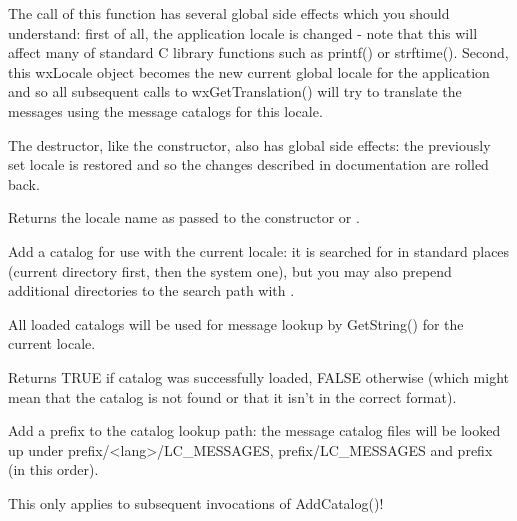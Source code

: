 The call of this function has several global side effects which you should
understand: first of all, the application locale is changed - note that this
will affect many of standard C library functions such as printf() or strftime().
Second, this wxLocale object becomes the new current global locale for the
application and so all subsequent calls to wxGetTranslation() will try to
translate the messages using the message catalogs for this locale.

\label{wxlocaledtor}


The destructor, like the constructor, also has global side effects: the previously
set locale is restored and so the changes described in 
 documentation are rolled back.

\label{wxlocalegetlocale}


Returns the locale name as passed to the constructor or 
.

\label{wxlocaleaddcatalog}


Add a catalog for use with the current locale: it is searched for in standard
places (current directory first, then the system one), but you may also prepend
additional directories to the search path with 
.

All loaded catalogs will be used for message lookup by GetString() for the
current locale.

Returns TRUE if catalog was successfully loaded, FALSE otherwise (which might
mean that the catalog is not found or that it isn't in the correct format).

\label{wxlocaleaddcataloglookuppathprefix}


Add a prefix to the catalog lookup path: the message catalog files will be
looked up under prefix/<lang>/LC\_MESSAGES, prefix/LC\_MESSAGES and prefix
(in this order).

This only applies to subsequent invocations of AddCatalog()!

